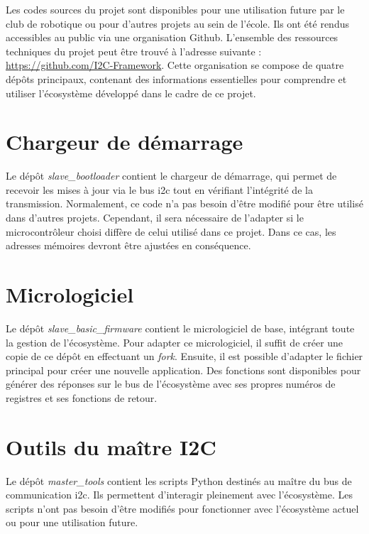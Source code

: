 Les codes sources du projet sont disponibles pour une utilisation future par le club de robotique ou pour d'autres projets au sein de l'école.
Ils ont été rendus accessibles au public via une organisation Github.
L'ensemble des ressources techniques du projet peut être trouvé à l'adresse suivante : \url{https://github.com/I2C-Framework}.
Cette organisation se compose de quatre dépôts principaux, contenant des informations essentielles pour comprendre et utiliser l'écosystème développé dans le cadre de ce projet.

\section{Chargeur de démarrage}

Le dépôt \textit{slave\_bootloader} contient le chargeur de démarrage, qui permet de recevoir les mises à jour via le bus \gls{i2c} tout en vérifiant l'intégrité de la transmission.
Normalement, ce code n'a pas besoin d'être modifié pour être utilisé dans d'autres projets.
Cependant, il sera nécessaire de l'adapter si le microcontrôleur choisi diffère de celui utilisé dans ce projet.
Dans ce cas, les adresses mémoires devront être ajustées en conséquence.

\section{Micrologiciel}

Le dépôt \textit{slave\_basic\_firmware} contient le micrologiciel de base, intégrant toute la gestion de l'écosystème.
Pour adapter ce micrologiciel, il suffit de créer une copie de ce dépôt en effectuant un \textit{fork}.
Ensuite, il est possible d'adapter le fichier principal pour créer une nouvelle application.
Des fonctions sont disponibles pour générer des réponses sur le bus de l'écosystème avec ses propres numéros de registres et ses fonctions de retour.

\section{Outils du maître I2C}

Le dépôt \textit{master\_tools} contient les scripts Python destinés au maître du bus de communication \gls{i2c}.
Ils permettent d'interagir pleinement avec l'écosystème.
Les scripts n'ont pas besoin d'être modifiés pour fonctionner avec l'écosystème actuel ou pour une utilisation future.